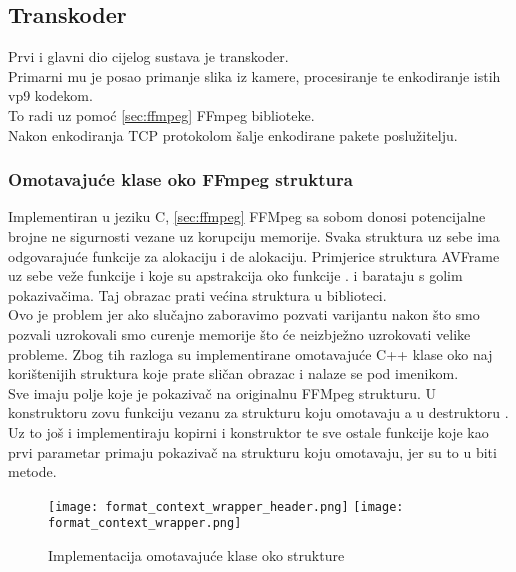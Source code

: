 \subsection{Transkoder}
Prvi i glavni dio cijelog sustava je transkoder.
\\
Primarni mu je posao primanje slika iz kamere, procesiranje te enkodiranje istih vp9 kodekom. 
\\
To radi uz pomoć \ref{sec:ffmpeg} FFmpeg biblioteke. 
\\
Nakon enkodiranja TCP protokolom šalje enkodirane pakete poslužitelju.

\subsubsection{Omotavajuće klase oko FFmpeg struktura} \label{sec:libav_wrappers}
Implementiran u jeziku C, \ref{sec:ffmpeg} FFMpeg sa sobom donosi potencijalne brojne ne sigurnosti vezane uz 
korupciju memorije.
\paraBreak
Svaka struktura uz sebe ima odgovarajuće funkcije za alokaciju i de alokaciju. Primjerice struktura AVFrame 
uz sebe veže funkcije  i  koje su apstrakcija oko funkcije 
. i barataju s golim pokazivačima. Taj obrazac prati većina struktura u biblioteci. \cite{ffmpegDocs} 
\\
Ovo je problem jer ako slučajno zaboravimo pozvati  varijantu nakon što smo pozvali 
uzrokovali smo curenje memorije što će neizbježno uzrokovati velike probleme.
\paraBreak
Zbog tih razloga su implementirane omotavajuće C++ klase oko naj korištenijih struktura koje prate sličan obrazac
i nalaze se pod  imenikom. 
\\
Sve imaju polje  koje je pokazivač na originalnu FFMpeg strukturu.
U konstruktoru zovu  funkciju vezanu za strukturu koju omotavaju a u destruktoru . Uz to još
i implementiraju kopirni i  konstruktor te sve ostale funkcije koje kao prvi parametar primaju pokazivač na
strukturu koju omotavaju, jer su to u biti metode.
\begin{figure}[h]
  \texttt{[image: format\_context\_wrapper\_header.png]}
  \texttt{[image: format\_context\_wrapper.png]}
  \caption[Implementacija omotavajuće klase]{Implementacija omotavajuće klase oko strukture }
\end{figure}
\clearpage

